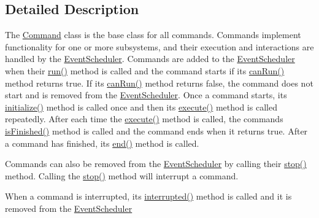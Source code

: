 \subsection{Detailed Description}
The \mbox{\hyperlink{classlib_iterative_robot_1_1_command}{Command}} class is the base class for all commands. Commands implement functionality for one or more subsystems, and their execution and interactions are handled by the \mbox{\hyperlink{classlib_iterative_robot_1_1_event_scheduler}{Event\+Scheduler}}. Commands are added to the \mbox{\hyperlink{classlib_iterative_robot_1_1_event_scheduler}{Event\+Scheduler}} when their \mbox{\hyperlink{classlib_iterative_robot_1_1_command_a3f3790d1b8033d7253a9f44481032ee9}{run()}} method is called and the command starts if its \mbox{\hyperlink{classlib_iterative_robot_1_1_command_aebef0fdf029a15ee48fbb778c4265609}{can\+Run()}} method returns true. If its \mbox{\hyperlink{classlib_iterative_robot_1_1_command_aebef0fdf029a15ee48fbb778c4265609}{can\+Run()}} method returns false, the command does not start and is removed from the \mbox{\hyperlink{classlib_iterative_robot_1_1_event_scheduler}{Event\+Scheduler}}. Once a command starts, its \mbox{\hyperlink{classlib_iterative_robot_1_1_command_a14543c9d38b07e52f9ffb2af88a63f60}{initialize()}} method is called once and then its \mbox{\hyperlink{classlib_iterative_robot_1_1_command_a4b38164af1a8645fae2fdae296317cf4}{execute()}} method is called repeatedly. After each time the \mbox{\hyperlink{classlib_iterative_robot_1_1_command_a4b38164af1a8645fae2fdae296317cf4}{execute()}} method is called, the command\textquotesingle{}s \mbox{\hyperlink{classlib_iterative_robot_1_1_command_a8e4dccdd88f432a716090f532ba097f7}{is\+Finished()}} method is called and the command ends when it returns true. After a command has finished, its \mbox{\hyperlink{classlib_iterative_robot_1_1_command_ab30847f09859387b70bb7846f7ce7ca4}{end()}} method is called.

Commands can also be removed from the \mbox{\hyperlink{classlib_iterative_robot_1_1_event_scheduler}{Event\+Scheduler}} by calling their \mbox{\hyperlink{classlib_iterative_robot_1_1_command_ac91308101424f447f80665244b554171}{stop()}} method. Calling the \mbox{\hyperlink{classlib_iterative_robot_1_1_command_ac91308101424f447f80665244b554171}{stop()}} method will interrupt a command.

When a command is interrupted, its \mbox{\hyperlink{classlib_iterative_robot_1_1_command_a1c17b601d1b69822cabadb92069d1747}{interrupted()}} method is called and it is removed from the \mbox{\hyperlink{classlib_iterative_robot_1_1_event_scheduler}{Event\+Scheduler}}

